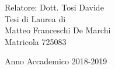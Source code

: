 \begin{titlepage}
\begin{center}
    \vfill
    \vspace{3cm}
    \begin{large}
    Relatore: Dott. Tosi Davide\\

    \vspace{1.0cm}
    Tesi di Laurea di\\
   Matteo Franceschi De Marchi\\
    Matricola 725083\\
    \vspace{0.5cm}

    \end{large}

    Anno Accademico 2018-2019

  \end{center}
\end{titlepage}
